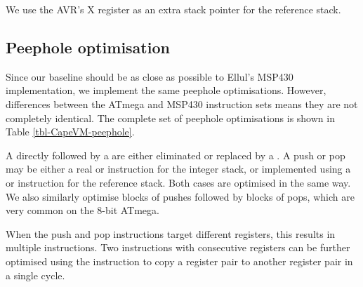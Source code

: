 We use the AVR's X register as an extra stack pointer for the reference stack.

\subsection{Peephole optimisation}
Since our baseline should be as close as possible to Ellul's MSP430 implementation, we implement the same peephole optimisations. However, differences between the ATmega and MSP430 instruction sets means they are not completely identical. The complete set of peephole optimisations is shown in Table \ref{tbl-CapeVM-peephole}.

A  directly followed by a  are either eliminated or replaced by a . A push or pop may be either a real  or  instruction for the integer stack, or implemented using a  or  instruction for the reference stack. Both cases are optimised in the same way. We also similarly optimise blocks of pushes followed by blocks of pops, which are very common on the 8-bit ATmega. 

When the push and pop instructions target different registers, this results in multiple  instructions. Two  instructions with consecutive registers can be further optimised using the  instruction to copy a register pair to another register pair in a single cycle.



